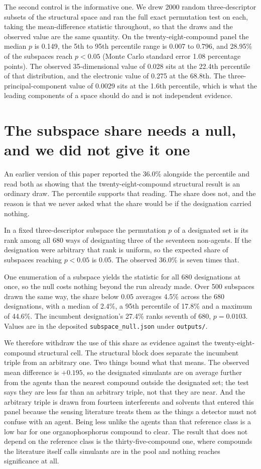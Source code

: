 \documentclass[11pt,a4paper]{article}
\begin{document}
The second control is the informative one. We drew 2000 random three-descriptor
subsets of the structural space and ran the full exact permutation test on each,
taking the mean-difference statistic throughout, so that the draws and the
observed value are the same quantity.
On the twenty-eight-compound panel the median $p$ is 0.149, the 5th to 95th
percentile range is 0.007 to 0.796, and 28.95\% of the subspaces reach $p<0.05$
(Monte Carlo standard error 1.08 percentage points). The observed
35-dimensional value of 0.028 sits at the 22.4th percentile of that
distribution, and the electronic value of 0.275 at the 68.8th. The
three-principal-component value of 0.0029 sits at the 1.6th percentile, which is
what the leading components of a space should do and is not independent
evidence.

\section{The subspace share needs a null, and we did not give it one}
\label{res:subspacenull}

An earlier version of this paper reported the 36.0\% alongside the percentile
and read both as showing that the twenty-eight-compound structural result is an
ordinary draw. The percentile supports that reading. The share does not, and the
reason is that we never asked what the share would be if the designation carried
nothing.

In a fixed three-descriptor subspace the permutation $p$ of a designated set is
its rank among all 680 ways of designating three of the seventeen non-agents. If
the designation were arbitrary that rank is uniform, so the expected share of
subspaces reaching $p<0.05$ is 0.05. The observed 36.0\% is seven times that.

One enumeration of a subspace yields the statistic for all 680 designations at
once, so the null costs nothing beyond the run already made. Over 500 subspaces
drawn the same way, the share below 0.05 averages 4.5\% across the 680
designations, with a median of 2.4\%, a 95th percentile of 17.8\% and a maximum
of 44.6\%. The incumbent designation's 27.4\% ranks seventh of 680, $p=0.0103$.
Values are in the deposited \texttt{subspace\_null.json} under
\texttt{outputs/}.

We therefore withdraw the use of this share as evidence against the
twenty-eight-compound structural cell. The structural block does separate the
incumbent triple from an arbitrary one. Two things bound what that means. The
observed mean difference is $+0.195$, so the designated simulants are on average
further from the agents than the nearest compound outside the designated set;
the test says they are less far than an arbitrary triple, not that they are
near. And the arbitrary triple is drawn from fourteen interferents and solvents
that entered this panel because the sensing literature treats them as the things
a detector must not confuse with an agent. Being less unlike the agents than
that reference class is a low bar for one organophosphorus compound to clear.
The result that does not depend on the reference class is the
thirty-five-compound one, where compounds the literature itself calls simulants
are in the pool and nothing reaches significance at all.
\end{document}
